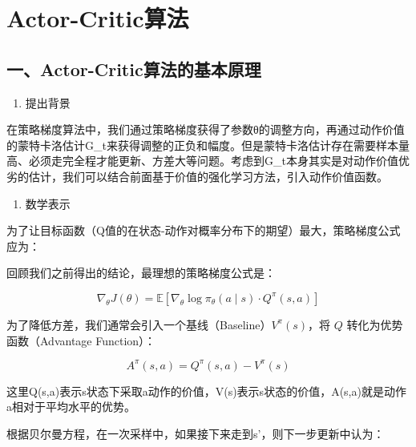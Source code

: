 \setcounter{section}{0}

\hypertarget{actor-criticux7b97ux6cd5}{%
\section{Actor-Critic算法}\label{actor-criticux7b97ux6cd5}}

\hypertarget{ux4e00actor-criticux7b97ux6cd5ux7684ux57faux672cux539fux7406}{%
\subsection{一、Actor-Critic算法的基本原理}\label{ux4e00actor-criticux7b97ux6cd5ux7684ux57faux672cux539fux7406}}

\begin{enumerate}
\def\labelenumi{\arabic{enumi}.}
\tightlist
\item
  提出背景
\end{enumerate}

在策略梯度算法中，我们通过策略梯度获得了参数θ的调整方向，再通过动作价值的蒙特卡洛估计G\_t来获得调整的正负和幅度。但是蒙特卡洛估计存在需要样本量高、必须走完全程才能更新、方差大等问题。考虑到G\_t本身其实是对动作价值优劣的估计，我们可以结合前面基于价值的强化学习方法，引入动作价值函数。

\begin{enumerate}
\def\labelenumi{\arabic{enumi}.}
\setcounter{enumi}{1}
\tightlist
\item
  数学表示
\end{enumerate}

为了让目标函数（Q值的在状态-动作对概率分布下的期望）最大，策略梯度公式应为：

回顾我们之前得出的结论，最理想的策略梯度公式是：

\[
\nabla_\theta J(\theta)=\mathbb{E}\left[\nabla_\theta\log\pi_\theta(a\mid s)\cdot Q^\pi(s,a)\right]
\]

为了降低方差，我们通常会引入一个基线（Baseline）\(V^\pi(s)\)，将 \(Q\) 转化为优势函数（Advantage Function）：

\[
A^\pi(s,a)=Q^\pi(s,a)-V^\pi(s)
\]

这里Q(s,a)表示s状态下采取a动作的价值，V(s)表示s状态的价值，A(s,a)就是动作a相对于平均水平的优势。

根据贝尔曼方程，在一次采样中，如果接下来走到s'，则下一步更新中认为：

